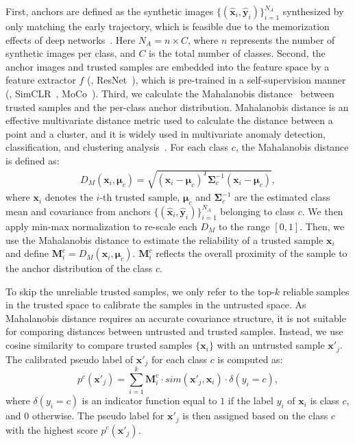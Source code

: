 First, anchors are defined as the synthetic images $\{\left(\hat{\bm{x}}_{i}, \hat{\bm{y}}_{i}\right)\}_{i=1}^{N_A}$ synthesized by only matching the early trajectory, which is feasible due to the memorization effects of deep networks~\cite{xia2020robust, arpit2017closer, liu2020early}.
Here $N_A = n \times C$, where $n$ represents the number of synthetic images per class, and $C$ is the total number of classes.
Second, the anchor images and trusted samples are embedded into the feature space by a feature extractor $f$ (\ie, ResNet~\cite{he2016deep}), which is pre-trained in a self-supervision manner (\eg, SimCLR~\cite{chen2020simple}, MoCo~\cite{he2020momentum}).
Third, we calculate the Mahalanobis distance~\cite{de2000mahalanobis} between trusted samples and the per-class anchor distribution. 
Mahalanobis distance is an effective multivariate distance metric used to calculate the distance between a point and a cluster, and it is widely used in multivariate anomaly detection, classification, and clustering analysis~\cite{colombo2022beyond, goswami2024fecam}. 
For each class $c$, the Mahalanobis distance is defined as:
\begin{equation}
\begin{aligned}
D_M(\bm{x}_{i}, \bm{\mu}_c) = \sqrt{(\bm{x}_{i} - \bm{\mu}_c)^T \mathbf{\Sigma}_c^{-1} (\bm{x}_{i} - \bm{\mu}_c)}, 
\end{aligned}
\label{eq7}
\end{equation}
where $\bm{x}_i$ denotes the $i$-th trusted sample, $\bm{\mu}_c$ and $\mathbf{\Sigma}_c^{-1}$ are the estimated class mean and covariance from anchors $\{\left(\hat{\bm{x}}_{i}, \hat{\bm{y}}_{i}\right)\}_{i=1}^{N_A}$ belonging to class $c$.
We then apply min-max normalization to re-scale each $D_M$ to the range $ \left [ 0,1 \right ]$. 
Then, we use the Mahalanobis distance to estimate the reliability of a trusted sample $\bm{x}_i$ and define $\bm{M}_i^c = D_M(\bm{x}_{i}, \bm{\mu}_c)$. 
$\bm{M}_i^c$ reflects the overall proximity of the sample to the anchor distribution of the class $c$. 


To skip the unreliable trusted samples, we only refer to the top-$k$ reliable samples in the trusted space to calibrate the samples in the untrusted space. 
As Mahalanobis distance requires an accurate covariance structure, it is not suitable for comparing distances between untrusted and trusted samples. 
Instead, we use cosine similarity to compare trusted samples $\{\bm{x}_i\}$ with an untrusted sample $\bm{x}'_j$.
The calibrated pseudo label of $\bm{x}'_j$ for each class $c$ is computed as: 
\begin{equation}
p^c(\bm{x}'_j) = \sum_{i=1}^{k} \bm{M}_i^c \cdot \mathit{sim}(\bm{x}'_j, \bm{x}_i) \cdot \delta(y_i = c),
\label{eq10}
\end{equation}
where $\delta(y_i = c)$ is an indicator function equal to $1$ if the label $y_i$ of $\bm{x}_i$ is class $c$, and $0$ otherwise. 
The pseudo label for $\bm{x}'_j$ is then assigned based on the class $c$ with the highest score $p^c(\bm{x}'_j)$.



